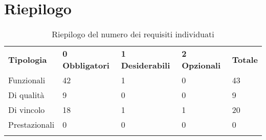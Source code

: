 \documentclass[AnalisiDeiRequisiti.tex]{subfiles}
\begin{document}
\section{Riepilogo}

\label{table:Riepilogo del numero dei requisiti individuati}
\renewcommand*{\arraystretch}{1.2}
\begin{longtable}[H]{p{2.8cm}p{2.9cm}p{2.9cm}p{2.9cm}p{1.5cm}}
	\rowcolor{CHeader}
	\color{CHeaderText} \textbf{Tipologia} & \color{CHeaderText} \textbf{0 Obbligatori} & \color{CHeaderText} \textbf{1 Desiderabili} & \color{CHeaderText} \textbf{2 Opzionali} & \color{CHeaderText} \textbf{Totale} \\  
	Funzionali & 42 & 1 & 0 & 43 \\  
	Di qualità & 9 & 0 & 0 & 9 \\  
	Di vincolo & 18 & 1 & 1 & 20 \\  
	Prestazionali & 0 & 0 & 0 & 0 \\  
	\hiderowcolors
	\caption{Riepilogo del numero dei requisiti individuati}
\end{longtable}
\end{document}
